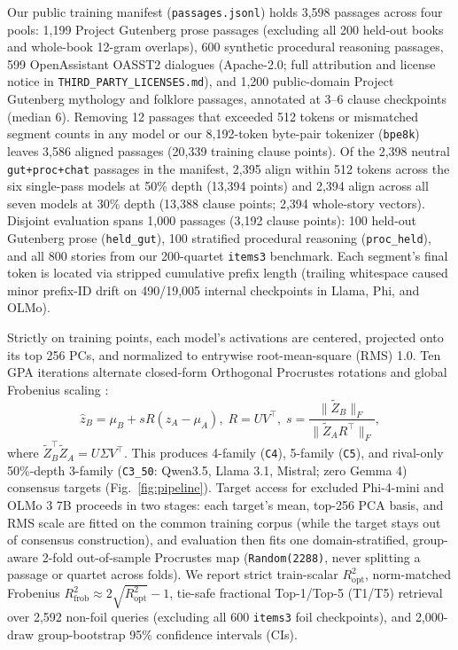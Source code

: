 \documentclass[conference]{IEEEtran}
\begin{document}
Our public training manifest (\texttt{passages.jsonl}) holds 3,598 passages across four pools: 1,199 Project Gutenberg prose passages (excluding all 200 held-out books and whole-book 12-gram overlaps), 600 synthetic procedural reasoning passages, 599 OpenAssistant OASST2 dialogues (Apache-2.0; full attribution and license notice in \texttt{THIRD\_PARTY\_LICENSES.md}), and 1,200 public-domain Project Gutenberg mythology and folklore passages, annotated at 3--6 clause checkpoints (median 6). Removing 12 passages that exceeded 512 tokens or mismatched segment counts in any model or our 8,192-token byte-pair tokenizer (\texttt{bpe8k}) leaves 3,586 aligned passages (20,339 training clause points). Of the 2,398 neutral \texttt{gut+proc+chat} passages in the manifest, 2,395 align within 512 tokens across the six single-pass models at 50\% depth (13,394 points) and 2,394 align across all seven models at 30\% depth (13,388 clause points; 2,394 whole-story vectors). Disjoint evaluation spans 1,000 passages (3,192 clause points): 100 held-out Gutenberg prose (\texttt{held\_gut}), 100 stratified procedural reasoning (\texttt{proc\_held}), and all 800 stories from our 200-quartet \texttt{items3} benchmark. Each segment's final token is located via stripped cumulative prefix length (trailing whitespace caused minor prefix-ID drift on 490/19,005 internal checkpoints in Llama, Phi, and OLMo).

Strictly on training points, each model's activations are centered, projected onto its top 256 PCs, and normalized to entrywise root-mean-square (RMS) 1.0. Ten GPA iterations alternate closed-form Orthogonal Procrustes rotations \cite{schonemann1966procrustes,gower1975gpa} and global Frobenius scaling \cite{cheng2026platoskey}:
\begin{equation}
  \hat{z}_B = \mu_B + s R (z_A - \mu_A),\; R = U V^\top,\; s = \frac{\|\tilde{Z}_B\|_F}{\|\tilde{Z}_A R^\top\|_F},
\end{equation}
where $\tilde{Z}_B^\top \tilde{Z}_A = U \Sigma V^\top$. This produces 4-family (\texttt{C4}), 5-family (\texttt{C5}), and rival-only 50\%-depth 3-family (\texttt{C3\_50}: Qwen3.5, Llama 3.1, Mistral; zero Gemma 4) consensus targets (Fig.~\ref{fig:pipeline}). Target access for excluded Phi-4-mini and OLMo 3 7B proceeds in two stages: each target's mean, top-256 PCA basis, and RMS scale are fitted on the common training corpus (while the target stays out of consensus construction), and evaluation then fits one domain-stratified, group-aware 2-fold out-of-sample Procrustes map (\texttt{Random(2288)}, never splitting a passage or quartet across folds). We report strict train-scalar $R^2_{\text{opt}}$, norm-matched Frobenius $R^2_{\text{frob}} \approx 2\sqrt{R^2_{\text{opt}}} - 1$, tie-safe fractional Top-1/Top-5 (T1/T5) retrieval over 2,592 non-foil queries (excluding all 600 \texttt{items3} foil checkpoints), and 2,000-draw group-bootstrap 95\% confidence intervals (CIs).
\end{document}
